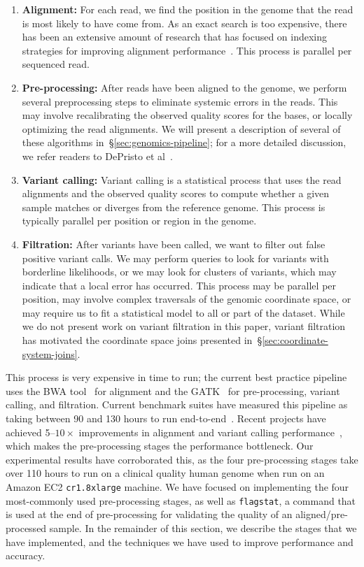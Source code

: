 \documentclass[10pt]{report} %
\begin{document}
\begin{enumerate}
\item \textbf{Alignment:} For each read, we find the position in the genome that the read is most likely to
have come from. As an exact search is too expensive, there has been an extensive amount of research
that has focused on indexing strategies for improving alignment performance~\cite{li10, li11,
zaharia11}. This process is parallel per sequenced read.
\item \textbf{Pre-processing:} After reads have been aligned to the genome, we perform several
preprocessing steps to eliminate systemic errors in the reads. This may involve recalibrating the
observed quality scores for the bases, or locally optimizing the read alignments. We will present a
description of several of these algorithms in~\S\ref{sec:genomics-pipeline}; for a more detailed
discussion, we refer readers to DePristo et al~\cite{depristo11}.
\item \textbf{Variant calling:} Variant calling is a statistical process that uses the read alignments
and the observed quality scores to compute whether a given sample matches or diverges
from the reference genome. This process is typically parallel per position or region in the genome.
\item \textbf{Filtration:} After variants have been called, we want to filter out false positive variant calls.
We may perform queries to look for variants with borderline likelihoods, or we may look for clusters of
variants, which may indicate that a local error has occurred. This process may be parallel per position,
may involve complex traversals of the genomic coordinate space, or may require us to fit a statistical
model to all or part of the dataset. While we do not present work on variant filtration in this paper, variant
filtration has motivated the coordinate space joins presented in~\S\ref{sec:coordinate-system-joins}.
\end{enumerate}

This process is very expensive in time to run; the current best practice pipeline uses the BWA tool~\cite{li10} for
alignment and the GATK~\cite{depristo11, mckenna10} for pre-processing, variant calling, and filtration.
Current benchmark suites have measured this pipeline as taking between 90 and 130 hours to run
end-to-end~\cite{talwalkar14}. Recent projects have achieved 5--$10\times$ improvements in alignment
and variant calling performance~\cite{rimmer14, zaharia11}, which makes the pre-processing stages
the performance bottleneck. Our experimental results have corroborated this, as the four pre-processing stages
take over 110 hours to run on a clinical quality human genome when run on an Amazon EC2 \texttt{cr1.8xlarge}
machine. We have focused on implementing the four most-commonly used pre-processing stages, as well as
\texttt{flagstat}, a command that is used at the end of pre-processing for validating the quality of an
aligned/pre-processed sample. In the remainder of this section, we describe the stages that we have implemented,
and the techniques we have used to improve performance and accuracy.
\end{document}
